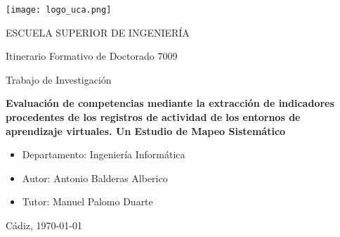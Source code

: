 

\begin{center}

  \texttt{[image: logo\_uca.png]} \\

  \vspace{2.0cm}

  \Large{ESCUELA SUPERIOR DE INGENIERÍA} \\

  \vspace{1.0cm}

  \large{Itinerario Formativo de Doctorado 7009} \\

  \vspace{2.0cm}

  \large{Trabajo de Investigación} \\

  \vspace{1.0cm}

  \Large{\textbf{Evaluación de competencias mediante la extracción de indicadores procedentes de los registros de actividad de los entornos de aprendizaje virtuales. Un Estudio de Mapeo Sistemático}} \\
    
  \vspace{3.0cm}

\end{center}

\begin{itemize}
\item \large{Departamento: Ingeniería Informática}
\item \large{Autor: Antonio Balderas Alberico}
\item \large{Tutor: Manuel Palomo Duarte}
\end{itemize}

\vspace{1.0cm}

\begin{flushright}
  \large{Cádiz, \today} \\

\end{flushright}
